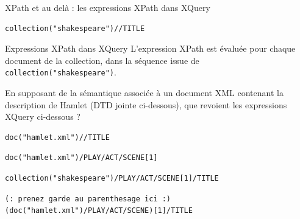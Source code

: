 \begin{frame}{XPath et au delà : les expressions XPath dans XQuery}

\begin{lstlisting}
collection("shakespeare")//TITLE
\end{lstlisting}

\begin{block}{Expressions  XPath dans XQuery}
L'expression XPath est évaluée pour chaque document de la collection, dans la séquence issue de \lstinline!collection("shakespeare")!.
\end{block}

\framebreak

\begin{exoblock}\small
En supposant de la sémantique associée à un document XML contenant la description de Hamlet (DTD jointe ci-dessous), que revoient les expressions XQuery ci-dessous ?
\end{exoblock}



\framebreak

\begin{lstlisting}
doc("hamlet.xml")//TITLE
\end{lstlisting}

\begin{lstlisting}
doc("hamlet.xml")/PLAY/ACT/SCENE[1]
\end{lstlisting}

\begin{lstlisting}
collection("shakespeare")/PLAY/ACT/SCENE[1]/TITLE
\end{lstlisting}

\begin{lstlisting}
(: prenez garde au parenthesage ici :)
(doc("hamlet.xml")/PLAY/ACT/SCENE)[1]/TITLE
\end{lstlisting}

\end{frame}

